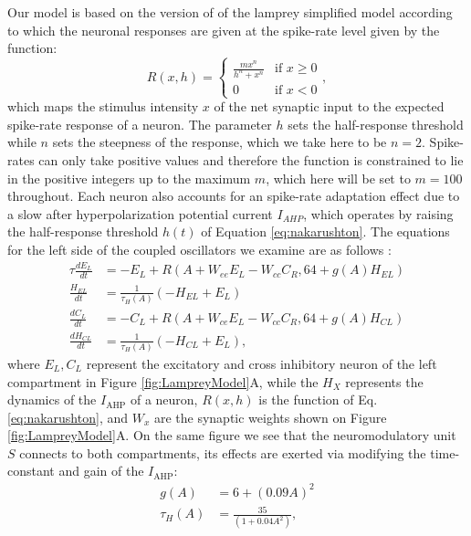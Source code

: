 \documentclass[11pt,a4paper]{article}
\begin{document}
Our model is based on the version of \cite{wilson1999spikes} of the lamprey simplified model \citep{lansner1997realistic}  according to which the neuronal responses are given at the spike-rate level given by the \cite{naka1966s} function:
\begin{equation}
\label{eq:nakarushton}
R(x,h) = \begin{cases} 
\frac{m x^n}{h^n + x^n} &\mbox{if } x \geq 0 \\
0 						&\mbox{if } x < 0
\end{cases},
\end{equation}
which maps the stimulus intensity $x$ of the net synaptic input to the expected spike-rate response of a neuron. The parameter $h$ sets the half-response threshold while $n$ sets the steepness of the response, which we take here to be $n=2$.
 Spike-rates can only take positive values and therefore the function is constrained to lie in the positive integers up to the maximum $m$, which here will be set to $m=100$ throughout. %
Each neuron also accounts for an spike-rate adaptation effect due to a slow after hyperpolarization potential current $I_{AHP}$, which operates by raising the half-response threshold $h(t)$ of Equation \eqref{eq:nakarushton}.
 The equations for the left side of the coupled oscillators we examine are as follows :
\begin{align}
\tau \frac{dE_L}{dt} & = - E_L +  R( A + W_{ee} E_L - W_{cc}C_R, 64 + g(A)H_{EL})\\
\frac{H_{EL}}{dt} &= \frac{1}{\tau_H(A)}(-H_{EL}+E_L)\\
\frac{dC_L}{dt} &= -C_L + R(A + W_{ce}E_L - W_{cc}C_R, 64+g(A)H_{CL})\\
\frac{dH_{CL}}{dt} &= \frac{1}{\tau_H(A)}(-H_{CL}+E_L),
\end{align}
where $E_L, C_L$ represent the excitatory and cross inhibitory neuron of the left compartment in Figure \ref{fig:LampreyModel}A, while the $H_{X}$ represents the dynamics of the $I_{\text{AHP}}$ of a neuron, $R(x,h)$ is the \cite{naka1966s} function of Eq. \eqref{eq:nakarushton}, and $W_x$ are the synaptic weights shown on Figure  \ref{fig:LampreyModel}A. On the same figure we see that the neuromodulatory unit $S$ connects to both compartments, its effects are exerted via modifying the time-constant and gain of the $I_{\text{AHP}}$:
\begin{align}
g(A) &= 6 + \left( 0.09A \right)^2\\
\tau_H(A) &= \frac{35}{(1 + 0.04 A^2)},
\end{align}
\end{document}
